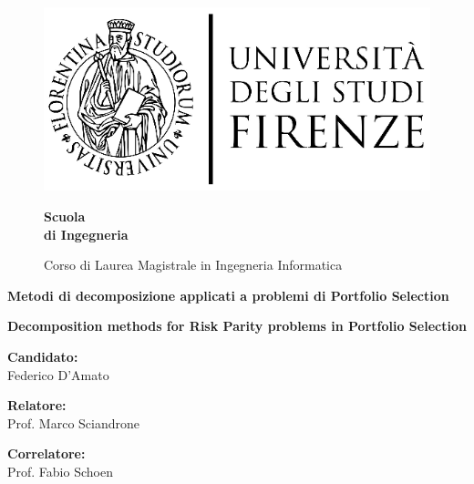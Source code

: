\begin{figure}[htbp]
\begin{minipage}{0.3\textwidth}
\centering
\includegraphics[scale=0.8]{logo_universita.eps}
\end{minipage}
\hspace{0.3\textwidth}
\begin{minipage}{0.4\textwidth}
\centering
\begin{flushright}
{\Large \textbf{Scuola\\
 di Ingegneria \\}
}
\end{flushright}
\begin{flushright}
Corso di Laurea Magistrale in Ingegneria Informatica
\end{flushright}
\end{minipage}

\end{figure}


\vspace{15mm}
\begin{center}

{\huge {\bf Metodi di decomposizione applicati a problemi di Portfolio Selection}
 }

\vspace{10mm} 
 {\huge {\bf Decomposition methods for Risk Parity problems in Portfolio Selection}
 }

\end{center}
\vspace{25mm}

\noindent
{\Large \textbf{Candidato:}}\\
\noindent
{\LARGE Federico D'Amato\\}

\begin{minipage}{0.5\textwidth}
{\Large \textbf{Relatore:}\\}
{\LARGE Prof. Marco Sciandrone
}
\end{minipage}
\begin{minipage}{0.5\textwidth}
\begin{flushright}
{\Large \textbf{Correlatore:}\\}
{\LARGE Prof. Fabio Schoen}
\end{flushright}
\end{minipage}
\vfill
{}